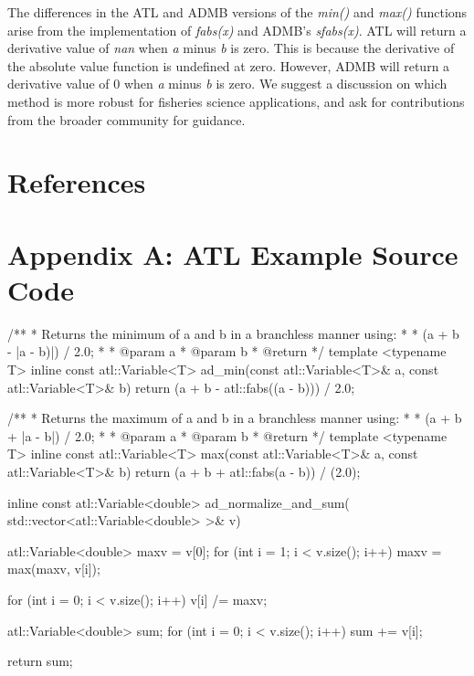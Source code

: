 \documentclass[oneside]{article}
\begin{document}
The differences in the ATL and ADMB versions of the \textit{min()} and \textit{max()} functions arise from the implementation of \textit{fabs(x)} and ADMB's \textit{sfabs(x)}.  ATL will return a derivative value of \textit{nan} when \textit{a} minus \textit{b} is zero. This is because the derivative of the absolute value function is undefined at zero. However, ADMB will return a derivative value of 0 when \textit{a} minus \textit{b} is zero. We suggest a discussion on which method is more robust for fisheries science applications, and ask for contributions from the broader community for guidance.

\section{References}

\section{Appendix A: ATL Example Source Code}

\begin{cppsource}

/**
 * Returns the minimum of a and b in a branchless manner using:
 *
 * (a + b - |a - b)|) / 2.0;
 *
 * @param a
 * @param b
 * @return
 */
template <typename T>
inline const atl::Variable<T> ad_min(const atl::Variable<T>& a,
const atl::Variable<T>& b) {
    return (a + b - atl::fabs((a - b))) / 2.0;
}

/**
 * Returns the maximum of a and b in a branchless manner using:
 *
 * (a + b + |a - b|) / 2.0;
 *
 * @param a
 * @param b
 * @return
 */
template <typename T>
inline const atl::Variable<T> max(const atl::Variable<T>& a,
 const atl::Variable<T>& b) {
    return (a + b + atl::fabs(a - b)) / (2.0);
}


inline const atl::Variable<double> ad_normalize_and_sum(
std::vector<atl::Variable<double> >& v) {
    atl::Variable<double> maxv = v[0];
    for (int i = 1; i < v.size(); i++) {
        maxv = max(maxv, v[i]);
    }

    for (int i = 0; i < v.size(); i++) {
        v[i] /= maxv;
    }

    atl::Variable<double> sum;
    for (int i = 0; i < v.size(); i++) {
        sum += v[i];
    }

    return sum;
}
\end{cppsource}
\end{document}
